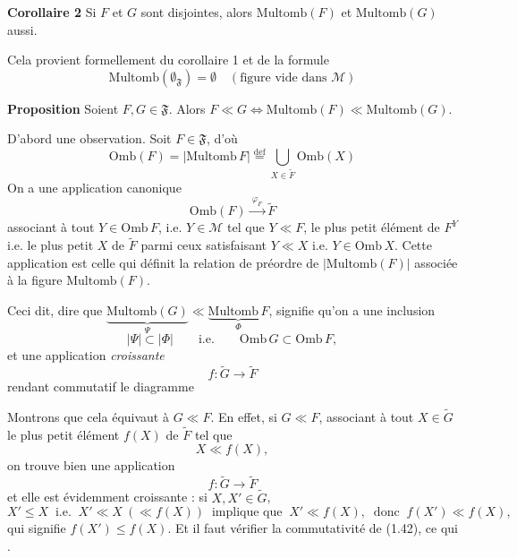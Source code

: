 \documentclass[11pt,a4paper]{article}
\begin{document}

\textbf{Corollaire 2} Si $F$ et $G$ sont disjointes, alors $\mathrm{Multomb}(F)$ et $\mathrm{Multomb}(G)$ aussi.

Cela provient formellement du corollaire 1 et de la formule
\[
  \mathrm{Multomb}(\emptyset_{\mathfrak{F}}) = \emptyset \quad (\text{figure vide dans } \mathcal{M}) \tag{1.40}
\]

\textbf{Proposition} Soient $F, G \in \mathfrak{F}$. Alors $F \ll G \Longleftrightarrow \mathrm{Multomb}(F) \ll \mathrm{Multomb}(G)$.

D'abord une observation. Soit $F \in \mathfrak{F}$, d'où
\[
  \mathrm{Omb}(F) = |\mathrm{Multomb}\, F| \overset{\mathrm{def}}{=} \bigcup_{X \in \widetilde{F}} \mathrm{Omb}(X)
\]
On a une application canonique
\[
  \mathrm{Omb}(F) \xrightarrow{\ \varphi_F\ } \widetilde{F}
\]
associant à tout $Y \in \mathrm{Omb}\, F$, i.e. $Y \in \mathcal{M}$ tel que \struck{\ill{}} $Y \ll F$, le plus petit élément de $F^{Y}$ i.e. le plus petit $X$ de $\widetilde{F}$ parmi ceux satisfaisant $Y \ll X$ i.e. \struck{\ill{}} $Y \in \mathrm{Omb}\, X$. Cette application est celle qui définit la relation de préordre de $|\mathrm{Multomb}(F)|$ associée à la figure $\mathrm{Multomb}(F)$.

Ceci dit, dire que $\underbrace{\mathrm{Multomb}(G)}_{\Psi} \ll \underbrace{\mathrm{Multomb}\, F}_{\Phi}$,  signifie qu'on a une inclusion
\[
  |\Psi| \subset |\Phi| \qquad \text{i.e.} \qquad \mathrm{Omb}\, G \subset \mathrm{Omb}\, F,
\]
et une application \emph{croissante} \struck{\ill{}}
\[
  f : \widetilde{G} \to \widetilde{F}
\]
rendant commutatif le diagramme 


Montrons que cela équivaut à $G \ll F$. En effet, si $G \ll F$, associant à tout $X \in \widetilde{G}$ le plus petit élément $f(X)$ de $\widetilde{F}$ tel que
\[
  X \ll f(X),
\]
on trouve bien une application
\[
  f : \widetilde{G} \to \widetilde{F}
\]
et elle est évidemment croissante : si $X, X' \in \widetilde{G}$,
\[
  X' \leq X \ \text{ i.e. } \ X' \ll X \ (\ll f(X)) \ \text{ implique que } \ X' \ll f(X), \ \text{ donc } \ f(X') \ll f(X),
\]
qui signifie $f(X') \leq f(X)$. Et il faut vérifier la commutativité de (1.42), ce qui  \ill{}.
\end{document}
